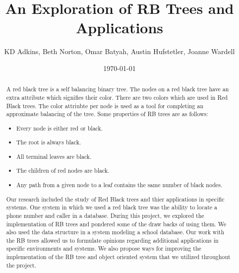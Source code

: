 \documentclass[notitlepage]{report}
\title{An Exploration of RB Trees and Applications}
\author{KD Adkins, Beth Norton, Omar Batyah, Austin Hufstetler, Joanne Wardell}
\date{\today}
\begin{document}
\maketitle
\thispagestyle{empty}

\begin{abstract}
	A red black tree is a self balancing binary tree. The nodes on a red black tree
	have an extra attribute which signifies their color. There are two colors which are
	used in Red Black trees. The color attriubte per node is used as a tool for completing 
	an approximate balancing of the tree. Some properties of RB trees are as follows: 
	\begin{itemize}
		\item Every node is either red or black.
		\item The root is always black.
		\item All terminal leaves are black.
		\item The children of red nodes are black.
		\item Any path from a given node to a leaf contains the same number of black nodes.
	\end{itemize}
	Our research included the study of Red Black trees and thier applications
	in specific systems. One system in which we used 
	a red black tree was the ability to locate a phone number and caller in a database. 
	During this project, we explored the implementation of RB trees 
	and pondered some of the draw backs of using them. We also used the data structure 
	in a system modeling a school database. Our work with the RB trees allowed us to 
	formulate opinions regarding additional applications in specific environments and systems.
	We also propose ways for improving the implementation of the RB tree and object oriented
	 system that we utilized throughout the project.
\end{abstract}
\end{document}
